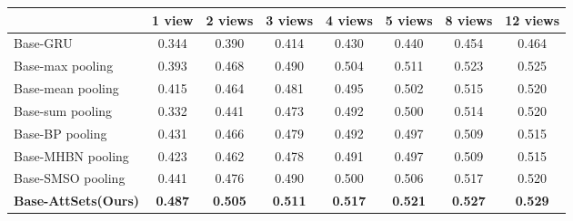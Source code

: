 \documentclass[twocolumn]{svjour3}    \pdfoutput=1
\newcommand{\nickname}{AttSets}
\begin{document}
\begin{table*}[t]
\caption{Group 1: mean IoU for multi-view reconstruction of all 40 categories in ModelNet40 testing split. All networks are firstly trained given only 1 image for each object in Stage 1. The \nickname{} module is further trained given \textbf{12 images} per object in Stage 2, while other competing approaches are fine-tuned given \textbf{12 images} per object in Stage 2.}
\centering
\label{tab:iou_modelnet_12v}
\tabcolsep=0.4cm
\begin{tabular}{ l|ccccccc}
\hline
&1 view&2 views&3 views& 4 views&5 views&8 views&12 views \\
\hline
Base-GRU &0.344&0.390&0.414&0.430&0.440&0.454&0.464\\
Base-max pooling &0.393&0.468&0.490&0.504&0.511&0.523&0.525\\
Base-mean pooling &0.415&0.464&0.481&0.495&0.502&0.515&0.520\\
Base-sum pooling &0.332&0.441&0.473&0.492&0.500&0.514&0.520\\
Base-BP pooling &0.431&0.466&0.479&0.492&0.497&0.509&0.515\\
Base-MHBN pooling &0.423&0.462&0.478&0.491&0.497&0.509&0.515\\
Base-SMSO pooling &0.441&0.476&0.490&0.500&0.506&0.517&0.520\\
\textbf{Base-\nickname{}(Ours)} &\textbf{0.487}&\textbf{0.505}&\textbf{0.511}&\textbf{0.517}&\textbf{0.521}&\textbf{0.527}
&\textbf{0.529} \\
\hline
\end{tabular}
\end{table*}
\end{document}
